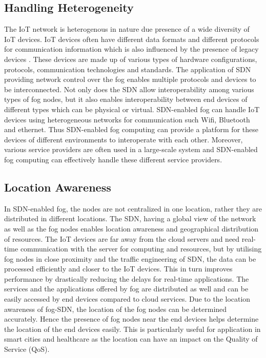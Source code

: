 \documentclass[conference]{IEEEtran}
\begin{document}
\subsection{Handling Heterogeneity }
The IoT network is heterogenous in nature due presence of a wide diversity of IoT devices. IoT devices often have different data formats and different protocols for communication information which is also influenced by the presence of legacy devices \cite{qin}. These devices are made up of various types of hardware configurations, protocols, communication technologies and standards. The application of SDN providing network control over the fog enables multiple protocols and devices to be interconnected. Not only does the SDN allow interoperability among various types of fog nodes, but it also enables interoperability between end devices of different types which can be physical or virtual. SDN-enabled fog can handle IoT devices using heterogeneous networks  for communication such Wifi, Bluetooth and ethernet\cite{bed}. Thus SDN-enabled fog computing can provide a platform for these devices of different environments to interoperate with each other. Moreover, various service providers are often used in a large-scale system and SDN-enabled fog computing can effectively handle these different service providers. 

\subsection{Location Awareness}
In SDN-enabled fog, the nodes are not centralized in one location, rather they are distributed in different locations. The SDN, having a global view of the network as well as the fog nodes enables location awareness and geographical distribution of resources\cite{atlam}. The IoT devices are far away from the cloud servers and need real-time communication with the server for computing and resources, but by utilising fog nodes in close proximity and the traffic engineering of SDN, the data can be processed efficiently and closer to the IoT devices. This in turn improves performance by drastically reducing the delays for real-time applications. The services and the applications offered by fog are distributed as well and can be easily accessed by end devices compared to cloud services. Due to the location awareness  of fog-SDN, the location of the fog nodes can be determined accurately\cite{gia}. Hence the presence of fog nodes near the end devices helps determine the location of the end devices easily\cite{zhang}. This is particularly useful for application in smart cities and healthcare as the location can have an impact on the Quality of Service (QoS)\cite{mark}.
\end{document}
